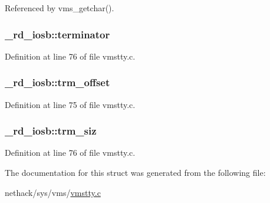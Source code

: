 Referenced by vms\+\_\+getchar().

\hypertarget{struct__rd__iosb_a9a563d5370747f6325699e23db4bf3cc}{
\subsubsection[{terminator}]{ \+\_\+rd\+\_\+iosb\+::terminator}}\label{struct__rd__iosb_a9a563d5370747f6325699e23db4bf3cc}


Definition at line 76 of file vmstty.\+c.

\hypertarget{struct__rd__iosb_a696589b1e1c424c40236ec56eb772013}{
\subsubsection[{trm\+\_\+offset}]{ \+\_\+rd\+\_\+iosb\+::trm\+\_\+offset}}\label{struct__rd__iosb_a696589b1e1c424c40236ec56eb772013}


Definition at line 75 of file vmstty.\+c.

\hypertarget{struct__rd__iosb_a10463708d782d828f44db79df8722725}{
\subsubsection[{trm\+\_\+siz}]{ \+\_\+rd\+\_\+iosb\+::trm\+\_\+siz}}\label{struct__rd__iosb_a10463708d782d828f44db79df8722725}


Definition at line 76 of file vmstty.\+c.



The documentation for this struct was generated from the following file\+:\begin{DoxyCompactItemize}
\item 
nethack/sys/vms/\hyperlink{vmstty_8c}{vmstty.\+c}\end{DoxyCompactItemize}
